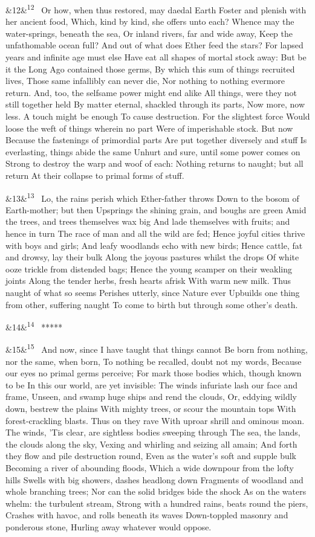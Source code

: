 \documentclass[12pt]{article}
\newcommand{\para}[1][]{\par\noindent\ifx&#1&\else\textsuperscript{\footnotesize #1}~\fi}
\begin{document}
\para[12] Or how, when thus restored, may daedal Earth Foster and plenish with her ancient food, Which, kind by kind, she offers unto each? Whence may the water-springs, beneath the sea, Or inland rivers, far and wide away, Keep the unfathomable ocean full? And out of what does Ether feed the stars? For lapsed years and infinite age must else Have eat all shapes of mortal stock away: But be it the Long Ago contained those germs, By which this sum of things recruited lives, Those same infallibly can never die, Nor nothing to nothing evermore return. And, too, the selfsame power might end alike All things, were they not still together held By matter eternal, shackled through its parts, Now more, now less. A touch might be enough To cause destruction. For the slightest force Would loose the weft of things wherein no part Were of imperishable stock. But now Because the fastenings of primordial parts Are put together diversely and stuff Is everlasting, things abide the same Unhurt and sure, until some power comes on Strong to destroy the warp and woof of each: Nothing returns to naught; but all return At their collapse to primal forms of stuff.

\para[13] Lo, the rains perish which Ether-father throws Down to the bosom of Earth-mother; but then Upsprings the shining grain, and boughs are green Amid the trees, and trees themselves wax big And lade themselves with fruits; and hence in turn The race of man and all the wild are fed; Hence joyful cities thrive with boys and girls; And leafy woodlands echo with new birds; Hence cattle, fat and drowsy, lay their bulk Along the joyous pastures whilst the drops Of white ooze trickle from distended bags; Hence the young scamper on their weakling joints Along the tender herbs, fresh hearts afrisk With warm new milk. Thus naught of what so seems Perishes utterly, since Nature ever Upbuilds one thing from other, suffering naught To come to birth but through some other's death.

\para[14] *****

\para[15] And now, since I have taught that things cannot Be born from nothing, nor the same, when born, To nothing be recalled, doubt not my words, Because our eyes no primal germs perceive; For mark those bodies which, though known to be In this our world, are yet invisible: The winds infuriate lash our face and frame, Unseen, and swamp huge ships and rend the clouds, Or, eddying wildly down, bestrew the plains With mighty trees, or scour the mountain tops With forest-crackling blasts. Thus on they rave With uproar shrill and ominous moan. The winds, 'Tis clear, are sightless bodies sweeping through The sea, the lands, the clouds along the sky, Vexing and whirling and seizing all amain; And forth they flow and pile destruction round, Even as the water's soft and supple bulk Becoming a river of abounding floods, Which a wide downpour from the lofty hills Swells with big showers, dashes headlong down Fragments of woodland and whole branching trees; Nor can the solid bridges bide the shock As on the waters whelm: the turbulent stream, Strong with a hundred rains, beats round the piers, Crashes with havoc, and rolls beneath its waves Down-toppled masonry and ponderous stone, Hurling away whatever would oppose.
\end{document}
